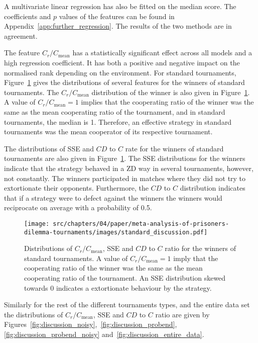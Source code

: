 A multivariate linear regression has also be fitted on the median score. The
coefficients and \(p\) values of the features can be found in
Appendix~\ref{app:further_regression}. The results of the two methods
are in agreement.

The feature \(C_{r} / C_{\text{mean}}\) has a statistically significant effect
across all models and a high regression coefficient. It has both a positive and
negative impact on the normalised rank depending on the environment. For
standard tournaments, Figure~\ref{fig:discussion_standard} gives the
distributions of several features for the winners of standard tournaments. The
\(C_{r} / C_{\text{mean}}\) distribution of the winner is also given in
Figure~\ref{fig:discussion_standard}. A value of \(C_r / C_{\text{mean}} = 1\)
implies that the cooperating ratio of the winner was the same as the mean
cooperating ratio of the tournament, and in standard tournaments, the median is
1. Therefore, an effective strategy in standard tournaments was the mean
cooperator of its respective tournament.

The distributions of SSE and \(CD\) to \(C\) rate for the winners of standard
tournaments are also given in Figure~\ref{fig:discussion_standard}. The SSE
distributions for the winners indicate that the strategy behaved in a ZD way in
several tournaments, however, not constantly. The winners participated in
matches where they did not try to extortionate their opponents. Furthermore, the
\(CD\) to \(C\) distribution indicates that if a strategy were to defect against
the winners the winners would reciprocate on average with a probability of 0.5.

\begin{figure}[!htbp]
    \centering
        \centering
        \texttt{[image: src/chapters/04/paper/meta-analysis-of-prisoners-dilemma-tournaments/images/standard\_discussion.pdf]}
        \caption{Distributions of \(C_r / C_{\text{mean}}\), SSE and \(CD\) to \(C\) ratio
        for the winners of standard tournaments. A
        value of \(C_r / C_{\text{mean}} = 1\) imply that the cooperating ratio of the
        winner was the same as the mean cooperating ratio of the tournament. An SSE distribution
        skewed towards 0 indicates a extortionate behaviour by the strategy.}
        \label{fig:discussion_standard}
\end{figure}

Similarly for the rest of the different tournaments types, and the entire data
set the distributions of \(C_r / C_{\text{mean}}\), SSE and \(CD\) to \(C\) ratio
are given by Figures~\ref{fig:discussion_noisy},~\ref{fig:discussion_probend},
\ref{fig:discussion_probend_noisy} and~\ref{fig:discussion_entire_data}.

